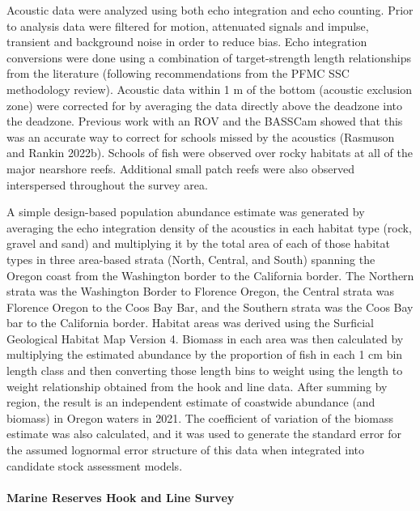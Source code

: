 \documentclass[11pt,
  english,
  letterpaper,
]{article}
\begin{document}
Acoustic data were analyzed using both echo integration and echo counting. Prior to analysis data were filtered for motion, attenuated signals and impulse, transient and background noise in order to reduce bias. Echo integration conversions were done using a combination of target-strength length relationships from the literature (following recommendations from the PFMC SSC methodology review). Acoustic data within 1 m of the bottom (acoustic exclusion zone) were corrected for by averaging the data directly above the deadzone into the deadzone. Previous work with an ROV and the BASSCam showed that this was an accurate way to correct for schools missed by the acoustics (Rasmuson and Rankin 2022b). Schools of fish were observed over rocky habitats at all of the major nearshore reefs. Additional small patch reefs were also observed interspersed throughout the survey area.

A simple design-based population abundance estimate was generated by averaging the echo integration density of the acoustics in each habitat type (rock, gravel and sand) and multiplying it by the total area of each of those habitat types in three area-based strata (North, Central, and South) spanning the Oregon coast from the Washington border to the California border. The Northern strata was the Washington Border to Florence Oregon, the Central strata was Florence Oregon to the Coos Bay Bar, and the Southern strata was the Coos Bay bar to the California border. Habitat areas was derived using the Surficial Geological Habitat Map Version 4. Biomass in each area was then calculated by multiplying the estimated abundance by the proportion of fish in each 1 cm bin length class and then converting those length bins to weight using the length to weight relationship obtained from the hook and line data. After summing by region, the result is an independent estimate of coastwide abundance (and biomass) in Oregon waters in 2021. The coefficient of variation of the biomass estimate was also calculated, and it was used to generate the standard error for the assumed lognormal error structure of this data when integrated into candidate stock assessment models.

\hypertarget{marine-reserves-hook-and-line-survey}{%
\paragraph{Marine Reserves Hook and Line Survey}\label{marine-reserves-hook-and-line-survey}}
\end{document}
